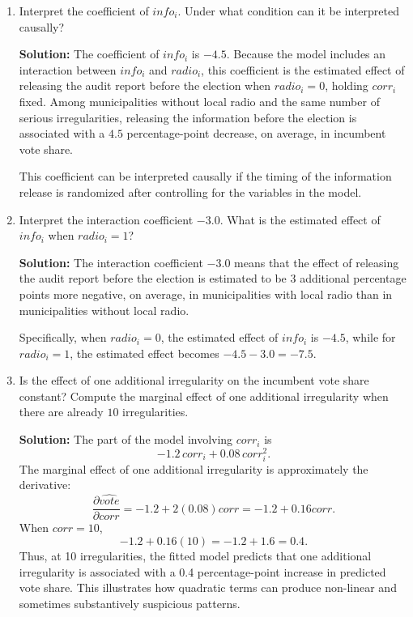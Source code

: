 \documentclass[11pt]{exam}
\begin{document}
\begin{questions}
\begin{enumerate}[leftmargin = 0.5cm, label = (\alph*), rightmargin = 0.2cm]
    \item Interpret the coefficient of $info_i$. Under what condition can it be interpreted causally?

    \begin{solutionorbox}[6.3cm]
    \textbf{Solution:} The coefficient of $info_i$ is $-4.5$. Because the model includes an interaction between $info_i$ and $radio_i$, this coefficient is the estimated effect of releasing the audit report before the election when $radio_i=0$, holding $corr_i$ fixed. Among municipalities without local radio and the same number of serious irregularities, releasing the information before the election is associated with a $4.5$ percentage-point decrease, on average, in incumbent vote share.

    This coefficient can be interpreted causally if the timing of the information release is randomized after controlling for the variables in the model.
    \end{solutionorbox}

    \item Interpret the interaction coefficient $-3.0$. What is the estimated effect of $info_i$ when $radio_i=1$?

    \begin{solutionorbox}[7cm]
    \textbf{Solution:} The interaction coefficient $-3.0$ means that the effect of releasing the audit report before the election is estimated to be $3$ additional percentage points more negative, on average, in municipalities with local radio than in municipalities without local radio.

    Specifically, when $radio_i=0$, the estimated effect of $info_i$ is
    $
    -4.5$, while
    for $radio_i=1$, the estimated effect becomes
    $
    -4.5-3.0=-7.5
    $.
    \end{solutionorbox}

    \item Is the effect of one additional irregularity on the incumbent vote share constant? Compute the marginal effect of one additional irregularity when there are already $10$ irregularities.

    \begin{solutionorbox}[8cm]
    \textbf{Solution:} The part of the model involving $corr_i$ is
    \[
    -1.2\,corr_i+0.08\,corr_i^2.
    \]
    The marginal effect of one additional irregularity is approximately the derivative:
    \[
    \frac{\partial \widehat{vote}}{\partial corr}=-1.2+2(0.08)corr=-1.2+0.16corr.
    \]
    When $corr=10$,
    \[
    -1.2+0.16(10)=-1.2+1.6=0.4.
    \]
    Thus, at 10 irregularities, the fitted model predicts that one additional irregularity is associated with a 0.4 percentage-point increase in predicted vote share. This illustrates how quadratic terms can produce non-linear and sometimes substantively suspicious patterns.
    \end{solutionorbox}


\end{enumerate}
\end{questions}
\end{document}
